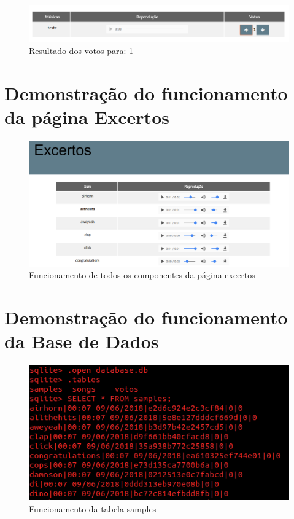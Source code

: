 \documentclass{report}
\begin{document}
\begin{figure} [h]
	\centering
	\includegraphics [scale = 0.4] {img/votos1}
	\caption{Resultado dos votos para: 1}
\end{figure}

\section{Demonstração do funcionamento da página Excertos}
\begin{figure} [h]
	\centering
	\includegraphics [scale = 0.3] {img/excertos}
	\caption{Funcionamento de todos os componentes da página excertos}
\end{figure}

\newpage
\section{Demonstração do funcionamento da Base de Dados}
\begin{figure} [h]
	\centering
	\includegraphics [scale = 0.4] {img/samples}
	\caption{Funcionamento da tabela samples}
\end{figure}
\end{document}

